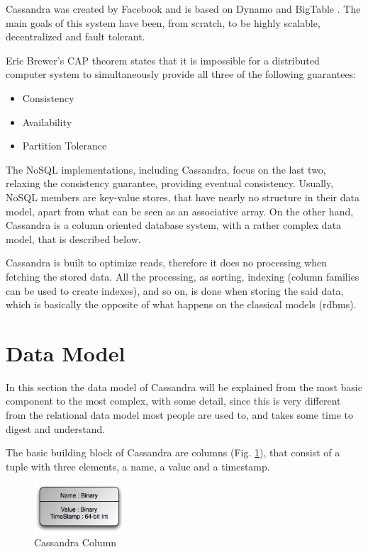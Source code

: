 Cassandra \cite{will10} was created by Facebook and is based on Dynamo \cite{Hastorun2007} and BigTable \cite{Chang2008}. The main goals of this system have been, from scratch, to be highly scalable, decentralized and fault tolerant.

Eric Brewer's CAP theorem \cite{Brewer2000} states that it is impossible for a distributed computer system to simultaneously provide all three of the following guarantees:
\begin{itemize}
	\item Consistency
	\item Availability
	\item Partition Tolerance
\end{itemize}

The NoSQL implementations, including Cassandra, focus on the last two, relaxing the consistency guarantee, providing eventual consistency. Usually, NoSQL members are key-value stores, that have nearly no structure in their data model, apart from what can be seen as an associative array. On the other hand, Cassandra is a column oriented database system, with a rather complex data model, that is described below.

Cassandra is built to optimize reads, therefore it does no processing when fetching the stored data. All the processing, as sorting, indexing (column families can be used to create indexes), and so on, is done when storing the said data, which is basically the opposite of what happens on the classical models (\ac{rdbms}).

\section{Data Model}
In this section the data model of Cassandra \cite{sarkissian09} will be explained from the most basic component to the most complex, with some detail, since this is very different from the relational data model most people are used to, and takes some time to digest and understand.

The basic building block of Cassandra are columns (Fig. \ref{fig:column}), that consist of a tuple with three elements, a name, a value and a timestamp.

\begin{figure}[htb]
  \begin{center}
    \leavevmode
    \includegraphics[width=0.3\textwidth]{images/column.jpg}
  \end{center}
  \caption{Cassandra Column}
  \label{fig:column}
\end{figure}

